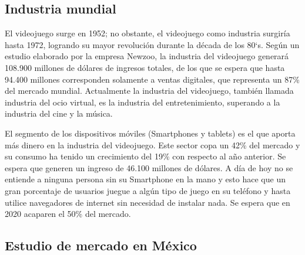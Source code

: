 \subsection{Industria mundial}
			 
			 El videojuego surge en 1952; no obstante, el videojuego como industria surgiría hasta 1972, logrando su mayor revolución durante la década de los 80`s. 
			 Según un estudio elaborado por la empresa Newzoo, la industria del videojuego generará 108.900 millones de dólares de ingresos totales, de los que se espera que hasta 94.400 millones corresponden solamente a ventas digitales, que representa un 87\% del mercado mundial. Actualmente la industria del videojuego, también llamada industria del ocio virtual, es la industria del entretenimiento, superando a la industria del cine y la música.	
			 
			 El segmento de los dispositivos móviles (Smartphones y tablets) es el que aporta más dinero en la industria del videojuego. Este sector copa un 42\% del mercado y su consumo ha tenido un crecimiento del 19\% con respecto al año anterior. Se espera que generen un ingreso de 46.100 millones de dólares. A día de hoy no se entiende a ninguna persona sin su Smartphone en la mano y esto hace que un gran porcentaje de usuarios juegue a algún tipo de juego en su teléfono y hasta utilice navegadores de internet sin necesidad de instalar nada. Se espera que en 2020 acaparen el 50\% del mercado. \cite{vid01}
			 
\subsection{Estudio de mercado en México}

